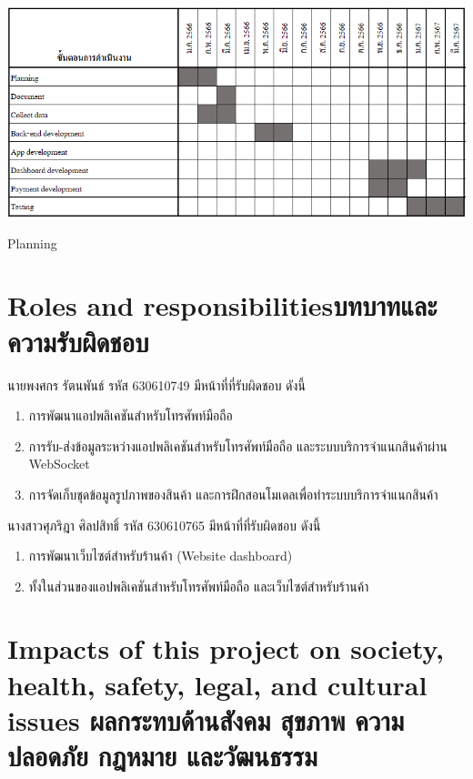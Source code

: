 \begin{table}[h]
    \begin{center}

        \vspace{0.5cm}\includegraphics[scale=0.64]{pic/plane.png}
    \end{center}

    \caption[Planning]{Planning}
    \label{table:Planning}
\end{table}

\newpage
\section{\ifenglish Roles and responsibilities\else บทบาทและความรับผิดชอบ\fi}
นายพงศกร รัตนพันธ์ รหัส 630610749 มีหน้าที่ที่รับผิดชอบ ดังนี้

\begin{enumerate}
    \item การพัฒนาแอปพลิเคชันสำหรับโทรศัพท์มือถือ
    \item การรับ-ส่งข้อมูลระหว่างแอปพลิเคชันสำหรับโทรศัพท์มือถือ และระบบบริการจำแนกสินค้าผ่าน WebSocket
    \item การจัดเก็บชุดข้อมูลรูปภาพของสินค้า และการฝึกสอนโมเดลเพื่อทำระบบบริการจำแนกสินค้า
\end{enumerate}


นางสาวศุภริฎา  ศิลปสิทธิ์ รหัส 630610765 มีหน้าที่ที่รับผิดชอบ ดังนี้
\begin{enumerate}
    \item การพัฒนาเว็บไซต์สำหรับร้านค้า (Website dashboard)
    \item ทั้งในส่วนของแอปพลิเคชันสำหรับโทรศัพท์มือถือ และเว็บไซต์สำหรับร้านค้า
\end{enumerate}
\section{\ifenglish%
      Impacts of this project on society, health, safety, legal, and cultural issues
  \else%
      ผลกระทบด้านสังคม สุขภาพ ความปลอดภัย กฎหมาย และวัฒนธรรม
  \fi}

